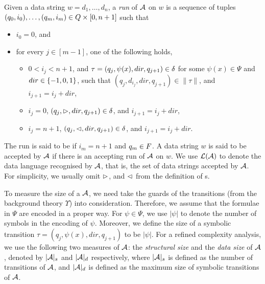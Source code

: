 Given a data string $w = d_1, \dots, d_n$, a \emph{run} of $\mathcal{A}$ on $w$
is a sequence of tuples $(q_0, i_0), \ldots, (q_m, i_m) \in Q \times [0, n+1]$ 
such that
\begin{itemize}
    \item $i_0 = 0$, and
    \item for every $j \in [m-1]$, one of the following holds,
    \begin{itemize}
  	\item $0 < i_j < n+1$,  and $\tau=(q_j, \psi(x), dir, q_{j+1}) \in \delta$ for some $\psi(x) \in \Psi$ and $dir \in \{-1, 0, 1\}$, such that $(q_j, d_{i_j}, dir, q_{j+1}) \in \|\tau\|$, and $i_{j+1} = i_j + dir$,
	\item $i_j = 0$, $(q_j, \vartriangleright, dir, q_{j+1}) \in \delta$, and $i_{j+1} = i_j + dir$,
	\item $i_j = n+1$, $(q_j, \vartriangleleft, dir, q_{j+1}) \in \delta$, and $i_{j+1} = i_j + dir$.
  \end{itemize}
\end{itemize}
The run is said to be  if $i_m = n+1$ and $q_m \in F$.
A data string $w$ is said to be accepted by $\mathcal{A}$ if there is an accepting run of
$\mathcal{A}$ on $w$. We use $\mathcal{L}(\mathcal{A})$ to denote the data language recognised by $\mathcal{A}$, that is,  the set of data strings accepted by $\mathcal{A}$.
%
For simplicity, we usually omit $\vartriangleright$, and $\vartriangleleft$ from the definition of \SSA{}s. 

To measure the size of a \SSA{} $\mathcal{A}$, we need take the guards of the transitions (from the background theory $\Upsilon$) into  consideration. Therefore, we assume that the formulae in $\Psi$ are encoded in a proper way. %
For $\psi \in \Psi$, we use $|\psi|$ to denote the number of symbols in the encoding of $\psi$. Moreover, we define the size of a symbolic transition $\tau = (q_j, \psi(x), dir, q_{j+1})$ to be $|\psi|$.
For a refined complexity analysis, we use the following two measures of $\mathcal{A}$: %
the \emph{structural size} and the \emph{data size} of $\mathcal{A}$, denoted by $|\mathcal{A}|_s$ and $|\mathcal{A}|_d$ respectively, where $|\mathcal{A}|_s$ is defined as the number of transitions of $\mathcal{A}$, and $|\mathcal{A}|_d$ is defined as the maximum size of symbolic transitions of $\mathcal{A}$.



